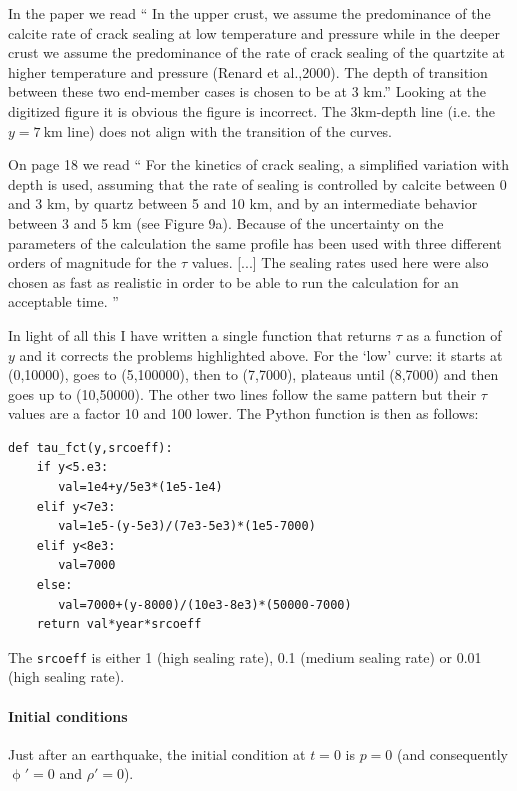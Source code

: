 In the paper we read ``
In the upper crust, we assume the predominance of the calcite rate of crack sealing
at low temperature and pressure while in the deeper crust we
assume the predominance of the rate of crack sealing of the
quartzite at higher temperature and pressure (Renard et al.,2000). 
The depth of transition between these two end-member cases is chosen to be at 3 km.''
Looking at the digitized figure it is obvious the figure is incorrect. The 3km-depth 
line (i.e. the $y=7~\si{\km}$ line) does not align with the transition of the curves.

On page 18 we read ``
For the kinetics of crack sealing, a simplified
variation with depth is used, assuming that the rate of
sealing is controlled by calcite between 0 and 3 km, by
quartz between 5 and 10 km, and by an intermediate
behavior between 3 and 5 km (see Figure 9a). Because of
the uncertainty on the parameters of the calculation the same
profile has been used with three different orders of magnitude 
for the $\tau$ values.
[...] The sealing rates used here were also chosen as fast
as realistic in order to be able to run the calculation for an
acceptable time.
''

In light of all this I have written a single function that returns $\tau$ as a function of $y$
and it corrects the problems highlighted above. 
For the `low' curve: it starts at (0,10000), goes to (5,100000), then to (7,7000), plateaus
until (8,7000) and then goes up to (10,50000).
The other two lines follow the same pattern but their $\tau$ values are a factor 10 and 100 lower.
The Python function is then as follows:
\begin{lstlisting}
def tau_fct(y,srcoeff):
    if y<5.e3:
       val=1e4+y/5e3*(1e5-1e4)
    elif y<7e3:
       val=1e5-(y-5e3)/(7e3-5e3)*(1e5-7000)
    elif y<8e3:
       val=7000
    else:
       val=7000+(y-8000)/(10e3-8e3)*(50000-7000)
    return val*year*srcoeff
\end{lstlisting}
The \lstinline{srcoeff} is either 1 (high sealing rate), 0.1 (medium sealing rate)
or 0.01 (high sealing rate).


\paragraph{Initial conditions}

Just after an earthquake, the initial condition at $t=0$ is $p=0$ (and consequently 
$\upphi'=0$  and $\rho'=0$).

